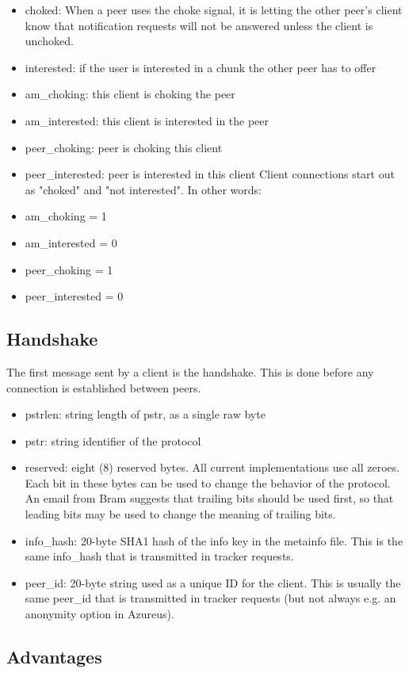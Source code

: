 \documentclass[letter]{scrartcl}
\begin{document}
\begin{itemize}
\item choked: When a peer uses the choke signal, it is letting the other peer’s client know that notification requests will not be answered unless the client is unchoked. 
\item interested: if the user is interested in a chunk the other peer has to offer
\item am\_choking: this client is choking the peer
\item am\_interested: this client is interested in the peer
\item peer\_choking: peer is choking this client
\item peer\_interested: peer is interested in this client
Client connections start out as "choked" and "not interested". In other words:
\item am\_choking = 1
\item am\_interested = 0
\item peer\_choking = 1
\item peer\_interested = 0
\end{itemize}

\subsection{Handshake}
The first message sent by a client is the handshake.  This is done before any connection is established between peers. 
\begin{itemize}
\item pstrlen: string length of pstr, as a single raw byte
\item pstr: string identifier of the protocol
\item reserved: eight (8) reserved bytes. All current implementations use all zeroes. Each bit in these bytes can be used to change the behavior of the protocol. An email from Bram suggests that trailing bits should be used first, so that leading bits may be used to change the meaning of trailing bits.
\item info\_hash: 20-byte SHA1 hash of the info key in the metainfo file. This is the same info\_hash that is transmitted in tracker requests.
\item peer\_id: 20-byte string used as a unique ID for the client. This is usually the same peer\_id that is transmitted in tracker requests (but not always e.g. an anonymity option in Azureus).
\end{itemize}
\subsection{Advantages}
\end{document}
